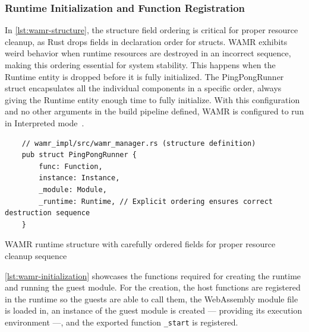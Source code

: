 \subsubsection{Runtime Initialization and Function Registration}
In \autoref{lst:wamr-structure}, the structure field ordering is critical for proper resource cleanup, as Rust drops fields in declaration order for structs. WAMR exhibits weird behavior when runtime resources are destroyed in an incorrect sequence, making this ordering essential for system stability. This happens when the Runtime entity is dropped before it is fully initialized. The PingPongRunner struct encapsulates all the individual components in a specific order, always giving the Runtime entity enough time to fully initialize. With this configuration and no other arguments in the build pipeline defined, WAMR is configured to run in Interpreted mode~\cite{wamr_running_modes}.

\begin{listing}[H]
    \begin{verbatim}
    // wamr_impl/src/wamr_manager.rs (structure definition)
    pub struct PingPongRunner {
        func: Function,
        instance: Instance,
        _module: Module,
        _runtime: Runtime, // Explicit ordering ensures correct destruction sequence
    }
    \end{verbatim}
    \caption{WAMR runtime structure with carefully ordered fields for proper resource cleanup sequence}
    \label{lst:wamr-structure}
\end{listing}

\autoref{lst:wamr-initialization} showcases the functions required for creating the runtime and running the guest module. For the creation, the host functions are registered in the runtime so the guests are able to call them, the WebAssembly module file is loaded in, an instance of the guest module is created --- providing its execution environment ---, and the exported function \texttt{\_start} is registered.

